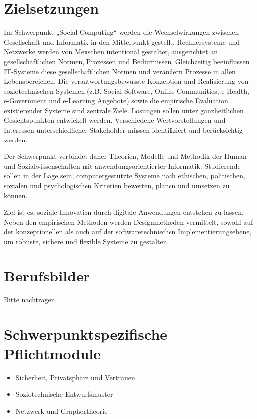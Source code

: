 \section*{Zielsetzungen}\label{zielsetzungen-2}

Im Schwerpunkt „Social Computing`` werden die Wechselwirkungen zwischen
Gesellschaft und Informatik in den Mittelpunkt gestellt. Rechnersysteme
und Netzwerke werden von Menschen intentional gestaltet, ausgerichtet an
gesellschaftlichen Normen, Prozessen und Bedürfnissen. Gleichzeitig
beeinflussen IT-Systeme diese gesellschaftlichen Normen und verändern
Prozesse in allen Lebensbereichen. Die verantwortungsbewusste Konzeption
und Realisierung von soziotechnischen Systemen (z.B. Social Software,
Online Communities, e-Health, e-Government und e-Learning Angebote)
sowie die empirische Evaluation existierender Systeme sind zentrale
Ziele. Lösungen sollen unter ganzheitlichen Gesichtspunkten entwickelt
werden. Verschiedene Wertvorstellungen und Interessen unterschiedlicher
Stakeholder müssen identifiziert und berücksichtig werden.

Der Schwerpunkt verbindet daher Theorien, Modelle und Methodik der
Human- und Sozialwissenschaften mit anwendungsorientierter Informatik.
Studierende sollen in der Lage sein, computergestützte Systeme nach
ethischen, politischen, sozialen und psychologischen Kriterien bewerten,
planen und umsetzen zu können.

Ziel ist es, soziale Innovation durch digitale Anwendungen entstehen zu
lassen. Neben den empirischen Methoden werden Designmethoden vermittelt,
sowohl auf der konzeptionellen als auch auf der softwaretechnischen
Implementierungsebene, um robuste, sichere und flexible Systeme zu
gestalten.

\section*{Berufsbilder}\label{berufsbilder-2}

Bitte nachtragen

\section*{Schwerpunktspezifische
Pflichtmodule}\label{schwerpunktspezifische-pflichtmodule-2}

\begin{itemize}
\tightlist
\item
  Sicherheit, Privatsphäre und Vertrauen
\item
  Soziotechnische Entwurfsmuster
\item
  Netzwerk-und Graphentheorie
\end{itemize}

